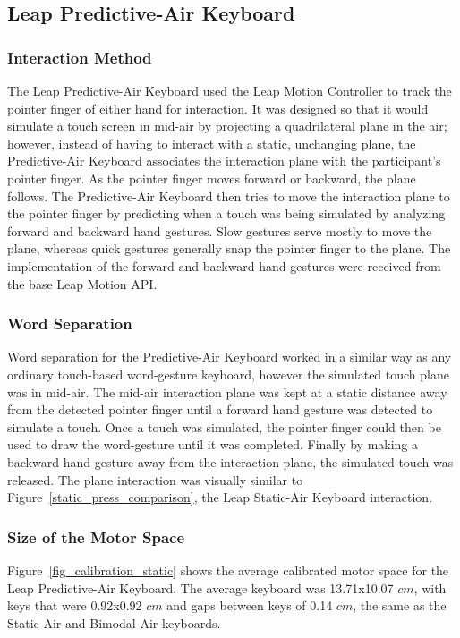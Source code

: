 \subsection{Leap Predictive-Air Keyboard}
\subsubsection{Interaction Method}
The Leap Predictive-Air Keyboard used the Leap Motion Controller to track the pointer finger of either hand for interaction. It was designed so that it would simulate a touch screen in mid-air by projecting a quadrilateral plane in the air; however, instead of having to interact with a static, unchanging plane, the Predictive-Air Keyboard associates the interaction plane with the participant's pointer finger. As the pointer finger moves forward or backward, the plane follows. The Predictive-Air Keyboard then tries to move the interaction plane to the pointer finger by predicting when a touch was being simulated by analyzing forward and backward hand gestures. Slow gestures serve mostly to move the plane, whereas quick gestures generally snap the pointer finger to the plane. The implementation of the forward and backward hand gestures were received from the base Leap Motion API.

\subsubsection{Word Separation}
Word separation for the Predictive-Air Keyboard worked in a similar way as any ordinary touch-based word-gesture keyboard, however the simulated touch plane was in mid-air. The mid-air interaction plane was kept at a static distance away from the detected pointer finger until a forward hand gesture was detected to simulate a touch. Once a touch was simulated, the pointer finger could then be used to draw the word-gesture until it was completed. Finally by making a backward hand gesture away from the interaction plane, the simulated touch was released. The plane interaction was visually similar to Figure~\ref{static_press_comparison}, the Leap Static-Air Keyboard interaction.

\subsubsection{Size of the Motor Space}
Figure~\ref{fig_calibration_static} shows the average calibrated motor space for the Leap Predictive-Air Keyboard. The average keyboard was 13.71x10.07 $cm$, with keys that were 0.92x0.92 $cm$ and gaps between keys of 0.14 $cm$, the same as the Static-Air and Bimodal-Air keyboards.

